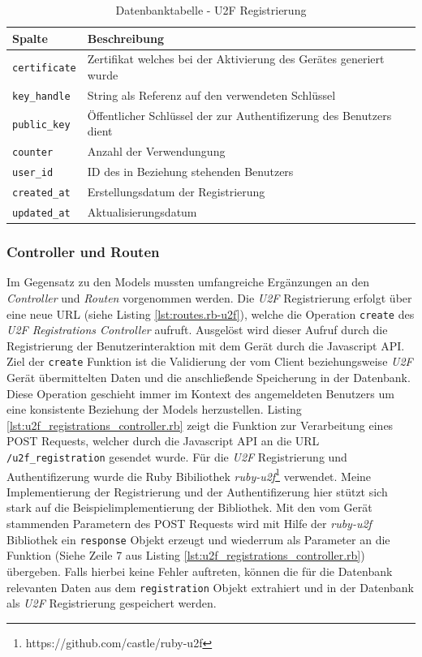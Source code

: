 \documentclass[11pt,a4paper,ngerman]{scrreprt}
\begin{document}
\begin{table}[htbp]
    \begin{tabularx}{\textwidth}{ lX }
        \toprule
        Spalte & Beschreibung \\ 
        \midrule
        \texttt{certificate} & Zertifikat welches bei der Aktivierung des Gerätes generiert wurde \\
        \texttt{key\_handle} & String als Referenz auf den verwendeten Schlüssel \\
        \texttt{public\_key} & Öffentlicher Schlüssel der zur Authentifizerung des Benutzers dient \\
        \texttt{counter} & Anzahl der Verwendungung \\
        \texttt{user\_id} & ID des in Beziehung stehenden Benutzers \\
        \texttt{created\_at} & Erstellungsdatum der Registrierung \\
        \texttt{updated\_at} & Aktualisierungsdatum \\
        \bottomrule
    \end{tabularx}
    \caption{Datenbanktabelle - U2F Registrierung}
    \label{table:db-u2f}
\end{table}
\clearpage
\subsubsection{Controller und Routen}
Im Gegensatz zu den Models mussten umfangreiche Ergänzungen an den \textit{Controller} und \textit{Routen} vorgenommen werden. Die \textit{U2F} Registrierung erfolgt über eine neue URL (siehe Listing \ref{lst:routes.rb-u2f}), welche die Operation \texttt{create} des \textit{U2F Registrations Controller} aufruft. Ausgelöst wird dieser Aufruf durch die Registrierung der Benutzerinteraktion mit dem Gerät durch die Javascript API. Ziel der \texttt{create} Funktion ist die Validierung der vom Client beziehungsweise \textit{U2F} Gerät übermittelten Daten und die anschließende Speicherung in der Datenbank. Diese Operation geschieht immer im Kontext des angemeldeten Benutzers um eine konsistente Beziehung der Models herzustellen. Listing \ref{lst:u2f_registrations_controller.rb} zeigt die Funktion zur Verarbeitung eines POST Requests, welcher durch die Javascript API an die URL \texttt{/u2f\_registration} gesendet wurde. Für die \textit{U2F} Registrierung und Authentifizerung wurde die Ruby Bibiliothek \textit{ruby-u2f}\footnote{https://github.com/castle/ruby-u2f} verwendet. Meine Implementierung der Registrierung und der Authentifizerung hier stützt sich stark auf die Beispielimplementierung der Bibliothek. Mit den vom Gerät stammenden Parametern des POST Requests wird mit Hilfe der \textit{ruby-u2f} Bibliothek ein \texttt{response} Objekt erzeugt und wiederrum als Parameter an die  Funktion (Siehe Zeile 7 aus Listing \ref{lst:u2f_registrations_controller.rb}) übergeben. Falls hierbei keine Fehler auftreten, können die für die Datenbank relevanten Daten aus dem \texttt{registration} Objekt extrahiert und in der Datenbank als \textit{U2F} Registrierung gespeichert werden.
\end{document}
